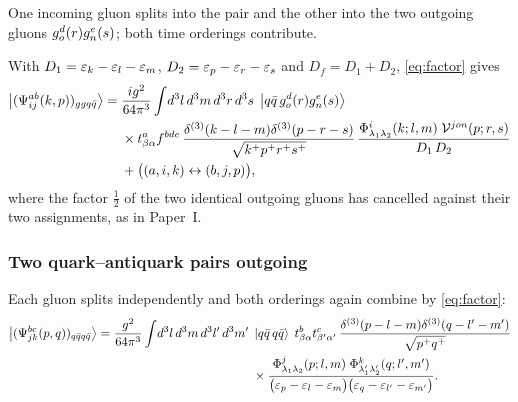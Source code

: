 One incoming gluon splits into the pair and the other into the two outgoing gluons
$g^{d}_{o}(r)g^{e}_{n}(s)$; both time orderings contribute.
\begin{center}
\end{center}
With $D_{1}=\varepsilon_{k}-\varepsilon_{l}-\varepsilon_{m}$, $D_{2}=\varepsilon_{p}-\varepsilon_{r}-\varepsilon_{s}$ and $D_{f}=D_{1}+D_{2}$,
\eqref{eq:factor} gives
\begin{align}
\left|(\Psi^{ab}_{ij}(k,p))_{ggq\bar q}\right\rangle=\;&\frac{ig^{2}}{64\pi^{3}}\int\!d^{3}l\,d^{3}m\,d^{3}r\,d^{3}s\;
\left|q\bar q\,g^{d}_{o}(r)g^{e}_{n}(s)\right\rangle
\nonumber\\&\times t^{a}_{\beta\alpha}f^{bde}\,
\frac{\delta^{(3)}(k-l-m)\delta^{(3)}(p-r-s)}{\sqrt{k^{+}p^{+}r^{+}s^{+}}}\,
\frac{\Phi^{i}_{\lambda_{1}\lambda_{2}}(k;l,m)\;\mathcal{V}^{jon}(p;r,s)}{D_{1}\,D_{2}}
\nonumber\\&+\big((a,i,k)\leftrightarrow(b,j,p)\big),
\label{eq:Pggqq}
\end{align}
where the factor $\tfrac12$ of the two identical outgoing gluons has cancelled against their two
assignments, as in Paper~I.

\subsubsection{Two quark--antiquark pairs outgoing}

Each gluon splits independently and both orderings again combine by \eqref{eq:factor}:
\begin{align}
\left|(\Psi^{bc}_{jk}(p,q))_{q\bar qq\bar q}\right\rangle=\frac{g^{2}}{64\pi^{3}}
\int\!d^{3}l\,d^{3}m\,d^{3}l'\,d^{3}m'\;
&\left|q\bar q\,q\bar q\right\rangle\;t^{b}_{\beta\alpha}t^{c}_{\beta'\alpha'}\,
\frac{\delta^{(3)}(p-l-m)\delta^{(3)}(q-l'-m')}{\sqrt{p^{+}q^{+}}}
\nonumber\\&\times
\frac{\Phi^{j}_{\lambda_{1}\lambda_{2}}(p;l,m)\;\Phi^{k}_{\lambda_{1}'\lambda_{2}'}(q;l',m')}
{\big(\varepsilon_{p}-\varepsilon_{l}-\varepsilon_{m}\big)\big(\varepsilon_{q}-\varepsilon_{l'}-\varepsilon_{m'}\big)} .
\label{eq:Pqqqq}
\end{align}

